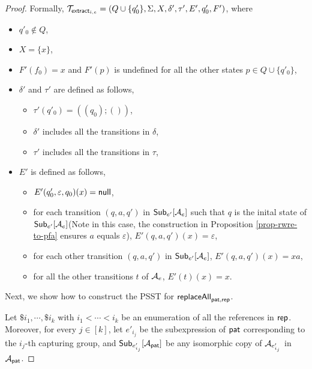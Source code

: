 \begin{proof}
        Formally, $\mathcal{T}_{\mathsf{extract}_{i,e}} = (Q \cup \{q'_0\}, \Sigma, X, \delta', \tau', E', q'_0, F')$, where
        \begin{itemize}
            \item $q'_0 \not \in Q$,
            \item $X = \{x\}$,
            \item $F'(f_0)= x$ and $F'(p)$ is undefined for all the other states $p \in Q  \cup \{q'_0\}$,
            \item $\delta'$ and $\tau'$ are defined as follows,
                \begin{itemize}
                    \item $\tau'(q'_0) = ((q_0); ())$,
                    \item $\delta'$ includes all the transitions in $\delta$,
                    \item $\tau'$ includes all the transitions in $\tau$,
                \end{itemize}
            \item $E'$ is defined as follows,
                \begin{itemize}
                    \item $E'(q'_0, \varepsilon, q_0)(x) = \mathsf{null}$,
                    \item for each transition $(q, a, q')$ in ${\sf Sub}_{e'}[\mathcal{A}_e]$ such that $q$ is the inital state of ${\sf Sub}_{e'}[\mathcal{A}_e]$(Note in this case, the construction in Proposition \ref{prop-rwre-to-pfa} ensures $a$ equals $\varepsilon$), $E'(q, a, q')(x) = \varepsilon$,
                    \item for each other transition $(q, a, q')$ in ${\sf Sub}_{e'}[\mathcal{A}_e]$, $E'(q, a, q')(x) = x a$,

                    \item for all the other transitions $t$ of $\mathcal{A}_e$, $E'(t)(x) = x$.
                \end{itemize}
        \end{itemize}

        Next, we show how to construct the PSST for $\mathsf{replaceAll}_{\mathsf{pat}, \mathsf{rep}}$.

        Let $\$i_1, \cdots, \$i_k$ with $i_1 < \cdots < i_k$ be an enumeration of all the references in $\mathsf{rep}$.
        Moreover, for every $j \in [k]$, let $e'_{i_j}$ be the subexpression of $\mathsf{pat}$ corresponding to the $i_j$-th capturing group, and ${\sf Sub}_{e'_{i_j}}[\mathcal{A}_{\mathsf{pat}}]$ be any isomorphic copy of $\mathcal{A}_{e'_{i_j}}$ in $\mathcal{A}_{\mathsf{pat}}$.


\end{proof}
